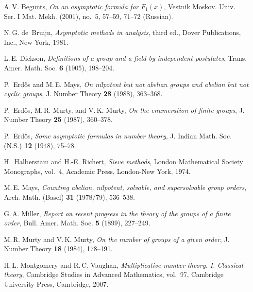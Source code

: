 \documentclass[11pt]{amsart}
\theoremstyle{remark}
\begin{document}
\providecommand{\bysame}{\leavevmode\hbox to3em{\hrulefill}\thinspace}
\providecommand{\MR}{\relax\ifhmode\unskip\space\fi MR }
\providecommand{\MRhref}[2]{%
  \href{http://www.ams.org/mathscinet-getitem?mr=#1}{#2}
}
\providecommand{\href}[2]{#2}
\begin{thebibliography}{OLBC10}

{A.\,V.} Begunts, \emph{On an asymptotic formula for {$F_1(x)$}}, Vestnik
  Moskov. Univ. Ser. I Mat. Mekh. (2001), no.~5, 57--59, 71--72 (Russian).

{N.\,G.} de~Bruijn, \emph{Asymptotic methods in analysis}, third ed., Dover
  Publications, Inc., New York, 1981.

{L.\,E.} Dickson, \emph{Definitions of a group and a field by independent
  postulates}, Trans. Amer. Math. Soc. \textbf{6} (1905), 198--204.

P.~Erd\H{o}s and {M.\,E.} Mays, \emph{On nilpotent but not abelian groups and
  abelian but not cyclic groups}, J. Number Theory \textbf{28} (1988),
  363--368.

P.~Erd\H{o}s, {M.\,R.} Murty, and {V.\,K.} Murty, \emph{On the enumeration of
  finite groups}, J. Number Theory \textbf{25} (1987), 360--378.

P.~Erd\H{o}s, \emph{Some asymptotic formulas in number theory}, J. Indian Math.
  Soc. (N.S.) \textbf{12} (1948), 75--78.

H.~Halberstam and H.-E. Richert, \emph{Sieve methods}, London Mathematical
  Society Monographs, vol.~4, Academic Press, London-New York, 1974.

{M.\,E.} Mays, \emph{Counting abelian, nilpotent, solvable, and supersolvable
  group orders}, Arch. Math. (Basel) \textbf{31} (1978/79), 536--538.

{G.\,A.} Miller, \emph{Report on recent progress in the theory of the groups of
  a finite order}, Bull. Amer. Math. Soc. \textbf{5} (1899), 227--249.

{M.\,R.} Murty and {V.\,K.} Murty, \emph{On the number of groups of a given
  order}, J. Number Theory \textbf{18} (1984), 178--191.

{H.\,L.} Montgomery and {R.\,C.} Vaughan, \emph{Multiplicative number theory.
  {I}. {C}lassical theory}, Cambridge Studies in Advanced Mathematics, vol.~97,
  Cambridge University Press, Cambridge, 2007.


\end{thebibliography}
\end{document}
